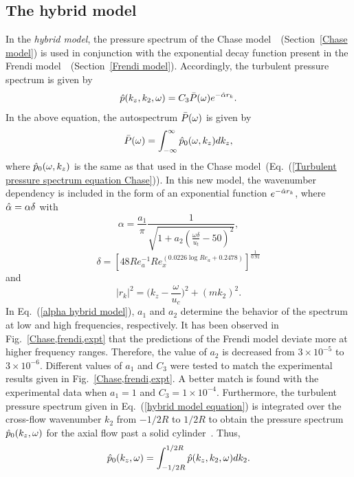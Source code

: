 \documentclass[11pt,cleanfoot]{asme2ej}
\begin{document}
\subsection{The hybrid model}
In the \textit{hybrid model}, the pressure spectrum of the Chase model~\cite{Chase1981}~(Section~\ref{Chase model}) is used in conjunction with the exponential decay function present in the Frendi model~\cite{frendi2020}~(Section~\ref{Frendi model}). Accordingly, the turbulent pressure spectrum is given by
\begin{equation}\label{hybrid model equation}
    \Hat{p}(k_{z},k_{2},\omega) = C_{3}\Bar{P}(\omega)e^{-\Hat{\alpha}r_{k}}.
\end{equation}
In the above equation, the autospectrum $\Bar{P}(\omega)$ is given by
\begin{equation}\label{autospectrum equation}
    \Bar{P}(\omega) = \int^{\infty}_{-\infty}\Hat{p}_{0}(\omega,k_{z})dk_{z},
\end{equation}
where $\Hat{p}_{0}(\omega,k_{z})$ is the same as that used in the Chase model~(Eq.~(\ref{Turbulent pressure spectrum equation Chase})). In this new model, the wavenumber dependency is included in the form of an exponential function $e^{-\Hat{\alpha}r_{k}}$, where $\Hat{\alpha} = \alpha\delta$ with
\begin{equation}\label{alpha hybrid model}
   \alpha = \frac{a_1}{\pi}\frac{1}{\sqrt{1+a_2(\frac{\omega \delta}{u_{t}}-50)^{2}}},
\end{equation}
\begin{equation}
    \delta = [48Re_a^{-1}Re_x^{(0.0226\log{Re_a}+0.2478)}]^{\frac{1}{0.91}}
\end{equation}
and
\begin{equation}
    |{r_{k}}|^{2} = \bigg(k_{z} - \frac{\omega}{u_{c}}\bigg)^{2} + (mk_{2})^{2}.
\end{equation}
In Eq.~(\ref{alpha hybrid model}), $a_1$ and $a_2$ determine the behavior of the spectrum at low and high frequencies, respectively. It has been observed in Fig.~\ref{Chase,frendi,expt} that the predictions of the Frendi model deviate more at higher frequency ranges. Therefore, the value of $a_2$ is decreased from $3\times10^{-5}$ to $3\times10^{-6}$. Different values of $a_1$ and $C_3$ were tested to match the experimental results given in Fig.~\ref{Chase,frendi,expt}. A better match is found with the experimental data when $a_1 = 1$ and $C_3=1\times10^{-4}$. Furthermore, the turbulent pressure spectrum given in Eq.~(\ref{hybrid model equation}) is integrated over the cross-flow wavenumber $k_2$ from $-1/2R$ to $1/2R$ to obtain the pressure spectrum $\Hat{p}_0(k_z,\omega)$ for the axial flow past a solid cylinder~\cite{Chase1981}. 
Thus,
\begin{equation}\label{hybrid model turbulent pressure}
    \Hat{p}_0(k_{z},\omega) = \int_{-1/2R}^{1/2R}\Hat{p}(k_{z},k_{2},\omega)dk_{2}.
\end{equation}
\end{document}

